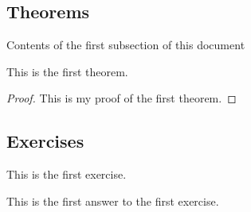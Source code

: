 \subsection{Theorems}
Contents of the first subsection of this document
\begin{theorem}[label=thm:1.1]
    This is the first theorem.
\end{theorem}
\begin{proof}
    This is my proof of the first theorem.
\end{proof}
%
\subsection{Exercises}
\begin{exercise}[label=ex:1.1]
    This is the first exercise.
\end{exercise}
\begin{answer}
    This is the first answer to the first exercise.
\end{answer}
% 
% 